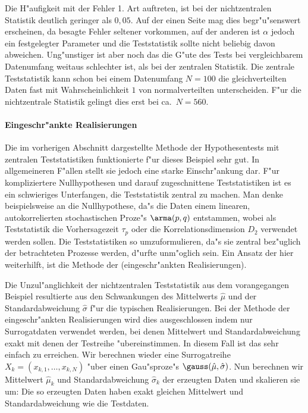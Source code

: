 Die H"aufigkeit mit der Fehler 1. Art auftreten, ist bei der nichtzentralen Statistik
deutlich geringer als $0,05$. Auf der einen Seite mag dies begr"u"senswert erscheinen, da
besagte Fehler seltener vorkommen, auf der anderen ist $\alpha$ jedoch ein festgelegter
Parameter und die Teststatistik sollte nicht beliebig davon abweichen. Ung"unstiger ist
aber noch das die G"ute des Tests bei vergleichbarem Datenumfang weitaus schlechter ist,
als bei der zentralen Statistik. Die zentrale Teststatistik kann schon bei einem
Datenumfang $N=100$ die gleichverteilten Daten fast mit Wahrscheinlichkeit $1$ von
normalverteilten unterscheiden. F"ur die nichtzentrale Statistik gelingt dies erst bei
ca.\  $N=560$.


\paragraph{Eingeschr"ankte Realisierungen}
Die im vorherigen Abschnitt dargestellte Methode der Hypothesentests mit zentralen
Teststatistiken funktionierte f"ur dieses Beispiel sehr gut. In allgemeineren F"allen
stellt sie jedoch eine starke Einschr"ankung dar. F"ur kompliziertere Nullhypothesen und
darauf zugeschnittene Teststatistiken ist es ein schwieriges Unterfangen, die
Teststatistik zentral zu machen.  Man denke beispielsweise an die Nullhypothese, da"s die
Daten einem linearen, autokorrelierten stochastischen Proze"s $\arma(p,q)$ entstammen,
wobei als Teststatistik die Vorhersagezeit $\tau_p$ oder die Korrelationsdimension $D_2$
verwendet werden sollen. Die Teststatistiken so umzuformulieren, da"s sie zentral
bez"uglich der betrachteten Prozesse werden, d"urfte unm"oglich sein. Ein Ansatz der hier
weiterhilft, ist die Methode der \begriff(eingeschr"ankten Realisierungen).

Die Unzul"anglichkeit der nichtzentralen Teststatistik aus dem vorangegangen Beispiel
resultierte aus den Schwankungen des Mittelwerts $\hat\mu$ und der Standardabweichung $\hat\sigma$ 
f"ur die typischen Realisierungen. Bei der Methode der eingeschr"ankten Realisierungen
wird dies ausgeschlossen indem nur Surrogatdaten verwendet werden, bei denen Mittelwert
und Standardabweichung exakt mit denen der Testreihe "ubereinstimmen. In diesem Fall ist
das sehr einfach zu erreichen. Wir berechnen wieder eine Surrogatreihe
$X_k=(x_{k,1},\dots,x_{k,N})$ "uber einen Gau"sproze"s $\gauss(\hat\mu,\hat\sigma)$. Nun
berechnen wir Mittelwert $\hat\mu_k$ und Standardabweichung $\hat\sigma_k$ der erzeugten
Daten und skalieren sie um:
Die so erzeugten Daten haben exakt gleichen Mittelwert und Standardabweichung wie die
Testdaten.

